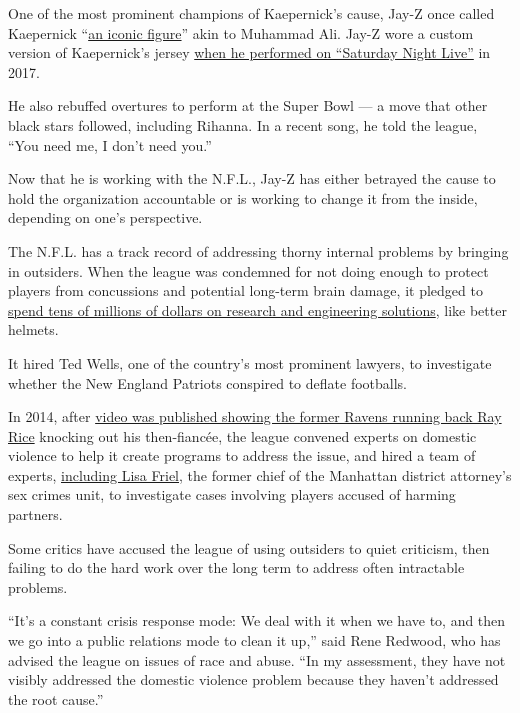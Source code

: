 One of the most prominent champions of Kaepernick's cause, Jay-Z once
called Kaepernick
``\href{https://www.cnn.com/2018/01/27/us/jay-z-colin-kaepernick-cnntv/index.html}{an
iconic figure}'' akin to Muhammad Ali. Jay-Z wore a custom version of
Kaepernick's jersey
\href{https://www.cbssports.com/nfl/news/look-jay-z-rocks-custom-colin-kaepernick-jersey-during-snl-performance/amp/}{when
he performed on ``Saturday Night Live''} in 2017.

He also rebuffed overtures to perform at the Super Bowl --- a move that
other black stars followed, including Rihanna. In a recent song, he told
the league, ``You need me, I don't need you.''

Now that he is working with the N.F.L., Jay-Z has either betrayed the
cause to hold the organization accountable or is working to change it
from the inside, depending on one's perspective.

The N.F.L. has a track record of addressing thorny internal problems by
bringing in outsiders. When the league was condemned for not doing
enough to protect players from concussions and potential long-term brain
damage, it pledged to
\href{https://www.nytimes3xbfgragh.onion/2013/02/03/sports/football/nfl-and-ge-team-up-in-effort-to-detect-concussions.html}{spend
tens of millions of dollars on research and engineering solutions}, like
better helmets.

It hired Ted Wells, one of the country's most prominent lawyers, to
investigate whether the New England Patriots conspired to deflate
footballs.

In 2014, after
\href{https://www.nytimes3xbfgragh.onion/2014/09/09/sports/football/ray-rice-video-shows-punch-and-raises-new-questions-for-nfl.html}{video
was published showing the former Ravens running back Ray Rice} knocking
out his then-fiancée, the league convened experts on domestic violence
to help it create programs to address the issue, and hired a team of
experts,
\href{https://www.nytimes3xbfgragh.onion/2016/02/05/sports/football/lisa-friel-ex-prosecutor-finds-plenty-to-do-as-the-nfls-top-investigator.html}{including
Lisa Friel}, the former chief of the Manhattan district attorney's sex
crimes unit, to investigate cases involving players accused of harming
partners.

Some critics have accused the league of using outsiders to quiet
criticism, then failing to do the hard work over the long term to
address often intractable problems.

``It's a constant crisis response mode: We deal with it when we have to,
and then we go into a public relations mode to clean it up,'' said Rene
Redwood, who has advised the league on issues of race and abuse. ``In my
assessment, they have not visibly addressed the domestic violence
problem because they haven't addressed the root cause.''


